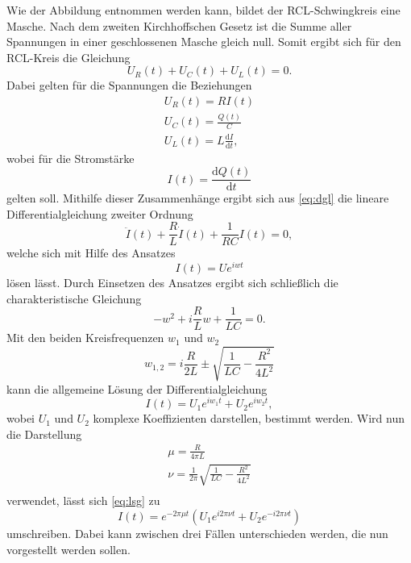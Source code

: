 Wie der Abbildung  entnommen werden kann, bildet der RCL-Schwingkreis eine Masche. Nach
dem zweiten Kirchhoffschen Gesetz ist die Summe aller Spannungen in einer geschlossenen Masche 
gleich null. Somit ergibt sich für den RCL-Kreis die Gleichung
\begin{equation}
    U_R(t)+U_C(t)+U_L(t) = 0.
    \label{eq:dgl}
\end{equation}
Dabei gelten für die Spannungen die Beziehungen
\begin{align*}
    U_R(t) = R I(t) \\ 
    U_C(t) = \frac{Q(t)}{C} \\ 
    U_L(t) = L \frac{\mathrm{d}I}{\mathrm{d}t},
\end{align*}
\noindent
wobei für die Stromstärke 
\begin{equation}
    I(t) = \frac{\mathrm{d}Q(t)}{\mathrm{d}t}
\end{equation}
\noindent
gelten soll. Mithilfe dieser Zusammenhänge ergibt sich aus \ref{eq:dgl} die lineare 
Differentialgleichung zweiter Ordnung
\begin{equation}
    \ddot{I}(t) + \frac{R}{L}\dot{I}(t) + \frac{1}{RC}I(t) = 0,
\end{equation}
\noindent
welche sich mit Hilfe des Ansatzes
\begin{equation}
    I(t) = U e^{iwt}
\end{equation}
\noindent 
lösen lässt. Durch Einsetzen des Ansatzes ergibt sich schließlich die charakteristische Gleichung
\begin{equation}
    -w^2 + i\frac{R}{L}w+\frac{1}{LC} = 0.
\end{equation}
\noindent
Mit den beiden Kreisfrequenzen $w_1$ und $w_2$ 
\begin{equation}
    w_{1,2} = i \frac{R}{2L} \pm \sqrt{\frac{1}{LC}-\frac{R^{2}}{4L^{2}}}
\end{equation}
\noindent
kann die allgemeine Lösung der Differentialgleichung 
\begin{equation}
    I(t) = U_1 e^{i w_1 t} + U_2 e^{i w_2 t},
    \label{eq:lsg}
\end{equation}
\noindent
wobei $U_1$ und $U_2$ komplexe Koeffizienten darstellen, bestimmt werden. Wird nun die 
Darstellung
\begin{align}
    \mu = \frac{R}{4\pi L} \nonumber \\
    \nu = \frac{1}{2\pi} \sqrt{\frac{1}{LC}-\frac{R^{2}}{4L^{2}}} \nonumber \\
\end{align}
\noindent
verwendet, lässt sich \ref{eq:lsg} zu
\begin{equation}
    I(t) = e^{-2\pi \mu t} \left( U_1 e^{i 2 \pi \nu t} + U_2 e^{-i 2 \pi \nu t} \right)
    \label{eq:Stromstaerke}
\end{equation}
\noindent
umschreiben. Dabei kann zwischen drei Fällen unterschieden werden, die nun vorgestellt 
werden sollen.








